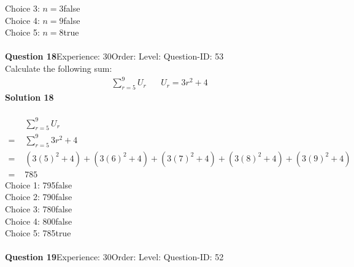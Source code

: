 \documentclass{article}
\begin{document}
Choice 3: \hspace{20pt}$n=3$\hspace{20pt}false\\
Choice 4: \hspace{20pt}$n=9$\hspace{20pt}false\\
Choice 5: \hspace{20pt}$n=8$\hspace{20pt}true\\
\\[4pt]
\noindent\textbf{Question 18}\hspace{20pt}Experience: 30\hspace{20pt}Order: \hspace{20pt}Level: \hspace{20pt}Question-ID: 53\\[2pt]
Calculate the following sum:
\begin{align*}
\sum_{r=5}^{9} U_r \hspace{20pt}U_r=3r^2+4
\end{align*}
\noindent\textbf{Solution 18}\\[2pt]
\\[-35pt]\begin{align*}
&\sum_{r=5}^{9} U_r\\[2pt]
=\,\,&\sum_{r=5}^{9} 3r^2+4\\[2pt]
=\,\,&(3(5)^2+4)+(3(6)^2+4)+(3(7)^2+4)+(3(8)^2+4)+(3(9)^2+4) \\[2pt]
=\,\,&785
\end{align*}
Choice 1: \hspace{20pt}795\hspace{20pt}false\\
Choice 2: \hspace{20pt}790\hspace{20pt}false\\
Choice 3: \hspace{20pt}780\hspace{20pt}false\\
Choice 4: \hspace{20pt}800\hspace{20pt}false\\
Choice 5: \hspace{20pt}785\hspace{20pt}true\\
\\[4pt]
\noindent\textbf{Question 19}\hspace{20pt}Experience: 30\hspace{20pt}Order: \hspace{20pt}Level: \hspace{20pt}Question-ID: 52\\[2pt]
\end{document}
